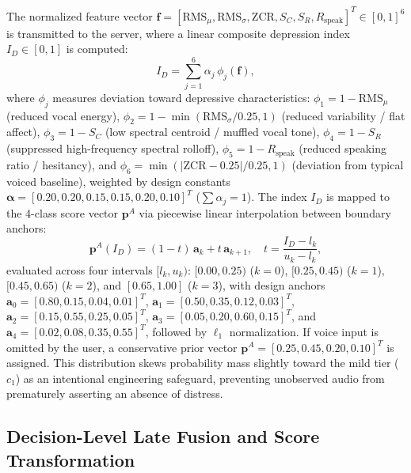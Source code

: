 \documentclass[10pt, conference, letterpaper]{IEEEtran}
\begin{document}
The normalized feature vector
$\mathbf{f} = [\text{RMS}_\mu, \text{RMS}_\sigma, \text{ZCR}, S_C, S_R, R_{\text{speak}}]^T \in [0,1]^6$
is transmitted to the server, where a linear composite depression index
$I_D \in [0,1]$ is computed:
\begin{equation}
  I_D = \sum_{j=1}^6 \alpha_j \, \phi_j(\mathbf{f}),
  \label{eq:acoustic_index}
\end{equation}
where $\phi_j$ measures deviation toward depressive characteristics:
$\phi_1 = 1 - \text{RMS}_\mu$ (reduced vocal energy),
$\phi_2 = 1 - \min(\text{RMS}_\sigma/0.25, 1)$ (reduced variability / flat affect),
$\phi_3 = 1 - S_C$ (low spectral centroid / muffled vocal tone),
$\phi_4 = 1 - S_R$ (suppressed high-frequency spectral rolloff),
$\phi_5 = 1 - R_{\text{speak}}$ (reduced speaking ratio / hesitancy), and
$\phi_6 = \min(|\text{ZCR} - 0.25|/0.25, 1)$ (deviation from typical voiced baseline),
weighted by design constants
$\boldsymbol{\alpha} = [0.20, 0.20, 0.15, 0.15, 0.20, 0.10]^T$ ($\sum \alpha_j = 1$).
The index $I_D$ is mapped to the 4-class score vector $\mathbf{p}^A$ via
piecewise linear interpolation between boundary anchors:
\begin{equation}
  \mathbf{p}^A(I_D) = (1-t)\,\mathbf{a}_k + t\,\mathbf{a}_{k+1}, \quad t = \frac{I_D - l_k}{u_k - l_k},
  \label{eq:audio_interp}
\end{equation}
evaluated across four intervals $[l_k, u_k)$: $[0.00, 0.25)$ ($k=0$),
$[0.25, 0.45)$ ($k=1$), $[0.45, 0.65)$ ($k=2$), and $[0.65, 1.00]$ ($k=3$),
with design anchors $\mathbf{a}_0 = [0.80, 0.15, 0.04, 0.01]^T$,
$\mathbf{a}_1 = [0.50, 0.35, 0.12, 0.03]^T$,
$\mathbf{a}_2 = [0.15, 0.55, 0.25, 0.05]^T$,
$\mathbf{a}_3 = [0.05, 0.20, 0.60, 0.15]^T$, and
$\mathbf{a}_4 = [0.02, 0.08, 0.35, 0.55]^T$, followed by $\ell_1$ normalization.
If voice input is omitted by the user, a conservative prior vector
$\mathbf{p}^A = [0.25, 0.45, 0.20, 0.10]^T$ is assigned.
This distribution skews probability mass slightly toward the mild tier ($c_1$)
as an intentional engineering safeguard, preventing unobserved audio from
prematurely asserting an absence of distress.

\subsection{Decision-Level Late Fusion and Score Transformation}
\label{sec:fusion}
\end{document}
